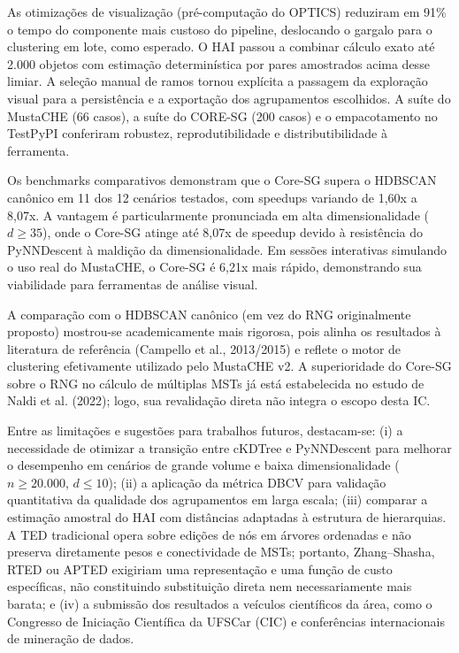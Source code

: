 \documentclass[12pt,a4paper,oneside]{article}
\begin{document}
As otimizações de visualização (pré-computação do OPTICS) reduziram em 91\% o tempo do
componente mais custoso do pipeline, deslocando o gargalo para o clustering em lote, como
esperado. O HAI passou a combinar cálculo exato até 2.000 objetos com estimação determinística
por pares amostrados acima desse limiar. A seleção manual de ramos tornou explícita a passagem
da exploração visual para a persistência e a exportação dos agrupamentos escolhidos. A suíte
do MustaCHE (66 casos), a suíte do CORE-SG (200 casos) e o empacotamento no TestPyPI conferiram
robustez, reprodutibilidade e distributibilidade à ferramenta.

Os benchmarks comparativos demonstram que o Core-SG supera o HDBSCAN canônico em 11 dos 12
cenários testados, com speedups variando de 1,60x a 8,07x. A vantagem é particularmente
pronunciada em alta dimensionalidade ($d \ge 35$), onde o Core-SG atinge até 8,07x de speedup
devido à resistência do PyNNDescent à maldição da dimensionalidade. Em sessões interativas
simulando o uso real do MustaCHE, o Core-SG é 6,21x mais rápido, demonstrando sua viabilidade
para ferramentas de análise visual.

A comparação com o HDBSCAN canônico (em vez do RNG originalmente proposto) mostrou-se
academicamente mais rigorosa, pois alinha os resultados à literatura de referência (Campello
et al., 2013/2015) e reflete o motor de clustering efetivamente utilizado pelo MustaCHE v2. A
superioridade do Core-SG sobre o RNG no cálculo de múltiplas MSTs já está estabelecida no estudo
de Naldi et al. (2022); logo, sua revalidação direta não integra o escopo desta IC.

Entre as limitações e sugestões para trabalhos futuros, destacam-se: (i) a necessidade de
otimizar a transição entre cKDTree e PyNNDescent para melhorar o desempenho em cenários de
grande volume e baixa dimensionalidade ($n \ge 20.000$, $d \le 10$); (ii) a aplicação da
métrica DBCV para validação quantitativa da qualidade dos agrupamentos em larga escala; (iii)
comparar a estimação amostral do HAI com distâncias adaptadas à estrutura de hierarquias. A TED
tradicional opera sobre edições de nós em árvores ordenadas e não preserva diretamente pesos e
conectividade de MSTs; portanto, Zhang--Shasha, RTED ou APTED exigiriam uma representação e uma
função de custo específicas, não constituindo substituição direta nem necessariamente mais
barata; e (iv) a submissão dos
resultados a veículos científicos da área, como o Congresso de Iniciação Científica da UFSCar
(CIC) e conferências internacionais de mineração de dados.
\end{document}
